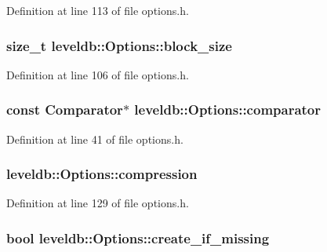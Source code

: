 Definition at line 113 of file options.\+h.

\hypertarget{structleveldb_1_1_options_a715c7941b43db641e76e598aa9ab52a0}{}
\subsubsection[{block\+\_\+size}]{\setlength{\rightskip}{0pt plus 5cm}size\+\_\+t leveldb\+::\+Options\+::block\+\_\+size}\label{structleveldb_1_1_options_a715c7941b43db641e76e598aa9ab52a0}


Definition at line 106 of file options.\+h.

\hypertarget{structleveldb_1_1_options_a7522fbf79de73c4f73ef8d9392e8c80b}{}
\subsubsection[{comparator}]{\setlength{\rightskip}{0pt plus 5cm}const {\bf Comparator}$\ast$ leveldb\+::\+Options\+::comparator}\label{structleveldb_1_1_options_a7522fbf79de73c4f73ef8d9392e8c80b}


Definition at line 41 of file options.\+h.

\hypertarget{structleveldb_1_1_options_abdaf09c8bb3a788636ffb86cb93b01ab}{}
\subsubsection[{compression}]{ leveldb\+::\+Options\+::compression}\label{structleveldb_1_1_options_abdaf09c8bb3a788636ffb86cb93b01ab}


Definition at line 129 of file options.\+h.

\hypertarget{structleveldb_1_1_options_afe1b4e94164ff8f081b1c25bf1bcb62e}{}
\subsubsection[{create\+\_\+if\+\_\+missing}]{\setlength{\rightskip}{0pt plus 5cm}bool leveldb\+::\+Options\+::create\+\_\+if\+\_\+missing}\label{structleveldb_1_1_options_afe1b4e94164ff8f081b1c25bf1bcb62e}


